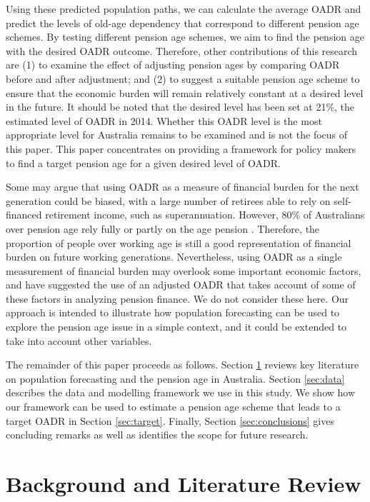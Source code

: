 \documentclass[11pt,a4paper,]{article}
\begin{document}
Using these predicted population paths, we can calculate the average OADR and predict the levels of old-age dependency that correspond to different pension age schemes. By testing different pension age schemes, we aim to find the pension age with the desired OADR outcome. Therefore, other contributions of this research are (1) to examine the effect of adjusting pension ages by comparing OADR before and after adjustment; and (2) to suggest a suitable pension age scheme to ensure that the economic burden will remain relatively constant at a desired level in the future. It should be noted that the desired level has been set at 21\%, the estimated level of OADR in 2014. Whether this OADR level is the most appropriate level for Australia remains to be examined and is not the focus of this paper. This paper concentrates on providing a framework for policy makers to find a target pension age for a given desired level of OADR.

Some may argue that using OADR as a measure of financial burden for the next generation could be biased, with a large number of retirees able to rely on self-financed retirement income, such as superannuation. However, 80\% of Australians over pension age rely fully or partly on the age pension \autocite{Power14}. Therefore, the proportion of people over working age is still a good representation of financial burden on future working generations. Nevertheless, using OADR as a single measurement of financial burden may overlook some important economic factors, and \textcite{HY12} have suggested the use of an adjusted OADR that takes account of some of these factors in analyzing pension finance. We do not consider these here. Our approach is intended to illustrate how population forecasting can be used to explore the pension age issue in a simple context, and it could be extended to take into account other variables.

The remainder of this paper proceeds as follows. Section \ref{sec:litreview} reviews key literature on population forecasting and the pension age in Australia. Section \ref{sec:data} describes the data and modelling framework we use in this study. We show how our framework can be used to estimate a pension age scheme that leads to a target OADR in Section \ref{sec:target}. Finally, Section \ref{sec:conclusions} gives concluding remarks as well as identifies the scope for future research.

\hypertarget{sec:litreview}{%
\section{Background and Literature Review}\label{sec:litreview}}
\end{document}
